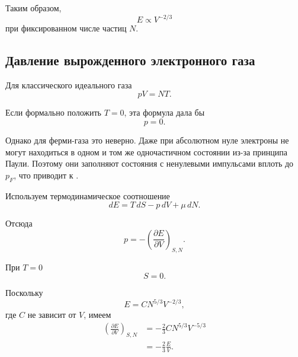 \documentclass[../final.tex]{subfiles}
\begin{document}
Таким образом,
%
\begin{equation*}
    E
    \propto
    V^{-2/3}
\end{equation*}
%
при фиксированном числе частиц $N$.



\subsection*{Давление вырожденного электронного газа}

Для классического идеального газа
%
\begin{equation*}
    pV
    =
    NT.
\end{equation*}

Если формально положить $T=0$, эта формула дала бы
%
\begin{equation*}
    p=0.
\end{equation*}

Однако для ферми-газа это неверно.
Даже при абсолютном нуле электроны не могут находиться
в одном и том же одночастичном состоянии из-за принципа Паули.
Поэтому они заполняют состояния с ненулевыми импульсами вплоть
до $p_F$, что приводит к .

Используем термодинамическое соотношение
%
\begin{equation*}
    dE
    =
    T\,dS
    -
    p\,dV
    +
    \mu\,dN.
\end{equation*}

Отсюда
%
\begin{equation*}
    p
    =
    -
    \left(
        \frac{
            \partial E
        }{
            \partial V
        }
    \right)_{S,N}.
\end{equation*}

При $T=0$
%
\begin{equation*}
    S=0.
\end{equation*}

Поскольку
%
\begin{equation*}
    E
    =
    C
    N^{5/3}
    V^{-2/3},
\end{equation*}
%
где $C$ не зависит от $V$, имеем
%
\begin{align*}
    \left(
        \frac{
            \partial E
        }{
            \partial V
        }
    \right)_{S,N}
    &=
    -
    \frac{2}{3}
    C
    N^{5/3}
    V^{-5/3}
    \\[3pt]
    &=
    -
    \frac{2}{3}
    \frac{E}{V}.
\end{align*}
\end{document}
